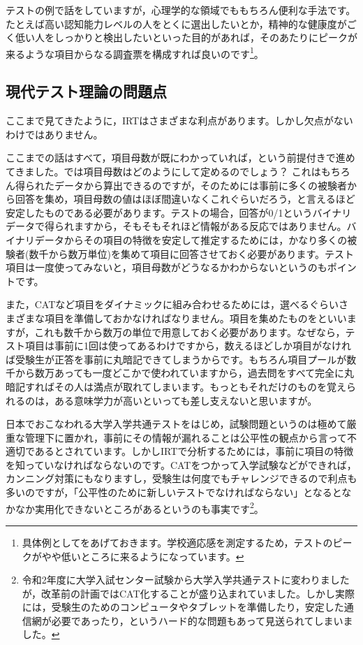 \documentclass{ltjsbook}
\begin{document}
テストの例で話をしていますが，心理学的な領域でももちろん便利な手法です。たとえば高い認知能力レベルの人をとくに選出したいとか，精神的な健康度がごく低い人をしっかりと検出したいといった目的があれば，そのあたりにピークが来るような項目からなる調査票を構成すれば良いのです\footnote{具体例として\textcite{kosugi120005596041}をあげておきます。学校適応感を測定するため，テストのピークがやや低いところに来るようになっています。}。


\subsection{現代テスト理論の問題点}
ここまで見てきたように，IRTはさまざまな利点があります。しかし欠点がないわけではありません。

ここまでの話はすべて，項目母数が既にわかっていれば，という前提付きで進めてきました。では項目母数はどのようにして定めるのでしょう？ これはもちろん得られたデータから算出できるのですが，そのためには事前に多くの被験者から回答を集め，項目母数の値はほぼ間違いなくこれぐらいだろう，と言えるほど安定したものである必要があります。テストの場合，回答が0/1というバイナリデータで得られますから，そもそもそれほど情報がある反応ではありません。バイナリデータからその項目の特徴を安定して推定するためには，かなり多くの被験者(数千から数万単位)を集めて項目に回答させておく必要があります。テスト項目は一度使ってみないと，項目母数がどうなるかわからないというのもポイントです。

また，CATなど項目をダイナミックに組み合わせるためには，選べるぐらいさまざまな項目を準備しておかなければなりません。項目を集めたものをといいますが，これも数千から数万の単位で用意しておく必要があります。なぜなら，テスト項目は事前に1回は使ってあるわけですから，数えるほどしか項目がなければ受験生が正答を事前に丸暗記できてしまうからです。もちろん項目プールが数千から数万あっても一度どこかで使われていますから，過去問をすべて完全に丸暗記すればその人は満点が取れてしまいます。もっともそれだけのものを覚えられるのは，ある意味学力が高いといっても差し支えないと思いますが。

日本でおこなわれる大学入学共通テストをはじめ，試験問題というのは極めて厳重な管理下に置かれ，事前にその情報が漏れることは公平性の観点から言って不適切であるとされています。しかしIRTで分析するためには，事前に項目の特徴を知っていなければならないのです。CATをつかって入学試験などができれば，カンニング対策にもなりますし，受験生は何度でもチャレンジできるので利点も多いのですが，「公平性のために新しいテストでなければならない」となるとなかなか実用化できないところがあるというのも事実です\footnote{令和2年度に大学入試センター試験から大学入学共通テストに変わりましたが，改革前の計画ではCAT化することが盛り込まれていました。しかし実際には，受験生のためのコンピュータやタブレットを準備したり，安定した通信網が必要であったり，というハード的な問題もあって見送られてしまいました。}。
\end{document}
